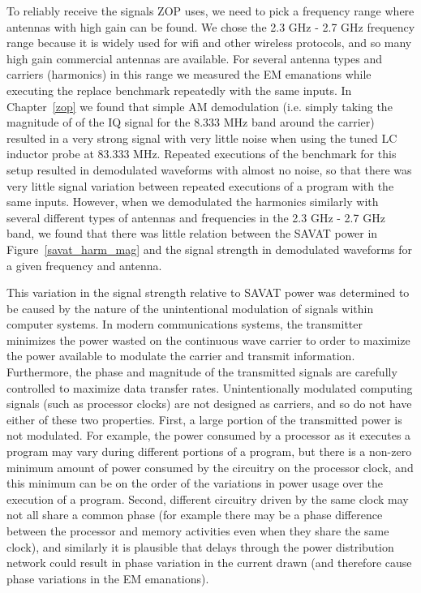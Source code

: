 To reliably receive the signals ZOP uses, we need to pick a frequency range where antennas with high gain can be found. We chose the 2.3 GHz - 2.7 GHz frequency range because it is widely used for wifi and other wireless protocols, and so many high gain commercial antennas are available. For several antenna types and carriers (harmonics) in this range we measured the EM emanations while executing the replace benchmark repeatedly with the same inputs. In Chapter~\ref{zop} we found that simple AM demodulation (i.e. simply taking the magnitude of of the IQ signal for the 8.333 MHz band around the carrier) resulted in a very strong signal with very little noise when using the tuned LC inductor probe at 83.333 MHz. Repeated executions of the benchmark for this setup resulted in demodulated waveforms with almost no noise, so that there was very little signal variation between repeated executions of a program with the same inputs. However, when we demodulated the harmonics similarly with several different types of antennas and frequencies in the 2.3 GHz - 2.7 GHz band, we found that there was little relation between the SAVAT power in Figure~\ref{savat_harm_mag} and the signal strength in demodulated waveforms for a given frequency and antenna. 

This variation in the signal strength relative to SAVAT power was determined to be caused by the nature of the unintentional modulation of signals within computer systems. In modern communications systems, the transmitter minimizes the power wasted on the continuous wave carrier to order to maximize the power available to modulate the carrier and transmit information. Furthermore, the phase and magnitude of the transmitted signals are carefully controlled to maximize data transfer rates. Unintentionally modulated computing signals (such as processor clocks) are not designed as carriers, and so do not have either of these two properties. First, a large portion of the transmitted power is not modulated. For example, the power consumed by a processor as it executes a program may vary during different portions of a program, but there is a non-zero minimum amount of power consumed by the circuitry on the processor clock, and this minimum can be on the order of the variations in power usage over the execution of a program. Second, different circuitry driven by the same clock may not all share a common phase (for example there may be a phase difference between the processor and memory activities even when they share the same clock), and similarly it is plausible that delays through the power distribution network could result in phase variation in the current drawn (and therefore cause phase variations in the EM emanations). 

